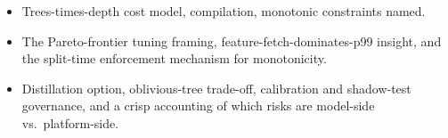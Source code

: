 \begin{interviewq}
\goodgreat
\begin{itemize}
    \item {} Trees-times-depth cost model, compilation, monotonic constraints named.
    \item {} The Pareto-frontier tuning framing, feature-fetch-dominates-p99 insight, and the split-time enforcement mechanism for monotonicity.
    \item {} Distillation option, oblivious-tree trade-off, calibration and shadow-test governance, and a crisp accounting of which risks are model-side vs.\ platform-side.
\end{itemize}

\end{interviewq}
